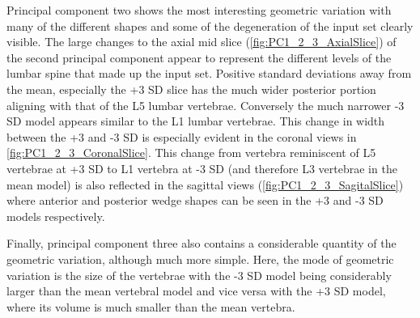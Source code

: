 Principal component two shows the most interesting geometric variation with many of the different shapes and some of the degeneration of the input set clearly visible.
The large changes to the axial mid slice (\cref{fig:PC1_2_3_AxialSlice}) of the second principal component appear to represent the different levels of the lumbar spine that made up the input set.
Positive standard deviations away from the mean, especially the +3 SD slice has the much wider posterior portion aligning with that of the L5 lumbar vertebrae.
Conversely the much narrower -3 SD model appears similar to the L1 lumbar vertebrae.
This change in width between the +3 and -3 SD is especially evident in the coronal views in \cref{fig:PC1_2_3_CoronalSlice}.
This change from vertebra reminiscent of L5 vertebrae at +3 SD to L1 vertebra at -3 SD (and therefore L3 vertebrae in the mean model) is also reflected in the sagittal views (\cref{fig:PC1_2_3_SagitalSlice}) where anterior and posterior wedge shapes can be seen in the +3 and -3 SD models respectively.

Finally, principal component three also contains a considerable quantity of the geometric variation, although much more simple.
Here, the mode of geometric variation is the size of the vertebrae with the -3 SD model being considerably larger than the mean vertebral model and vice versa with the +3 SD model, where its volume is much smaller than the mean vertebra.


